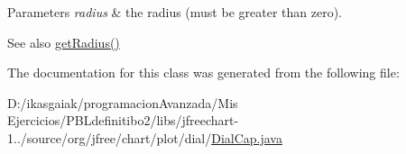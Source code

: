\begin{DoxyParams}{Parameters}
{\em radius} & the radius (must be greater than zero).\\
\hline
\end{DoxyParams}
\begin{DoxySeeAlso}{See also}
\mbox{\hyperlink{classorg_1_1jfree_1_1chart_1_1plot_1_1dial_1_1_dial_cap_ad9d82886f81da0f1e38a92e2d6f6b41d}{get\+Radius()}} 
\end{DoxySeeAlso}


The documentation for this class was generated from the following file\+:\begin{DoxyCompactItemize}
\item 
D\+:/ikasgaiak/programacion\+Avanzada/\+Mis Ejercicios/\+P\+B\+Ldefinitibo2/libs/jfreechart-\/1../source/org/jfree/chart/plot/dial/\mbox{\hyperlink{_dial_cap_8java}{Dial\+Cap.\+java}}\end{DoxyCompactItemize}
